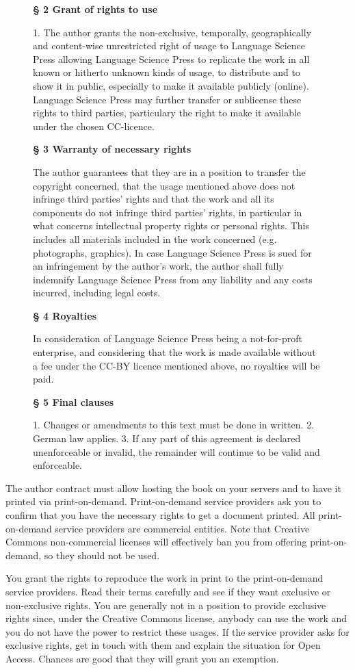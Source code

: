 \documentclass[nonflat,modfonts,output=book] {langsci/langscibook}
\begin{document}
\begin{figure}
{{{\medskip\noindent
\textbf{§ 2 Grant of rights to use}

1. The author grants the non-exclusive, temporally, geographically and content-wise unrestricted right of usage to Language Science Press allowing Language Science Press to replicate the work in all known or hitherto unknown kinds of usage, to distribute and to show it in public, especially to make it available publicly (online). Language Science Press may further transfer or sublicense these rights to third parties, particulary the right to make it available under the chosen CC-licence. 

\medskip\noindent
\textbf{§ 3 Warranty of necessary rights}

The author guarantees that they are in a position to transfer the copyright concerned, that the usage mentioned above does not infringe third parties' rights and that the work and all its components do not infringe third parties' rights, in particular in what concerns intellectual property rights or personal rights. This includes all materials included in the work concerned (e.g. photographs, graphics). In case Language Science Press is sued for an infringement by the author's work, the author shall fully indemnify Language Science Press from any liability and any costs incurred, including legal costs. 

\medskip\noindent
\textbf{§ 4 Royalties}

In consideration of Language Science Press being a not-for-proft enterprise, and considering that the work is made available without a fee under the CC-BY licence mentioned above, no royalties will be paid. 

\medskip\noindent
\textbf{§ 5 Final clauses}

1. Changes or amendments to this text must be done in written.
2. German law applies.
3. If any part of this agreement is declared unenforceable or invalid, the remainder will continue to be valid and enforceable.
 }
}}
\end{figure}


The author contract must allow hosting the book on your servers and to have it printed via  print-on-demand.
Print-on-demand service providers ask you to confirm that you have the necessary rights to get a document printed. 
All print-on-demand service providers are commercial entities. Note that Creative Commons non-commercial licenses will effectively ban you from offering print-on-demand, so they should not be used. 

You grant the rights to reproduce the work in print to the print-on-demand service providers. Read their terms carefully and see if they want exclusive or non-exclusive rights. You are generally not in a position to provide exclusive rights since, under the Creative Commons license, anybody can use the work and you do not have the power to restrict these usages. If the service provider asks for exclusive rights, get in touch with them and explain the situation for Open Access. Chances are good that they will grant you an exemption. 
\end{document}
